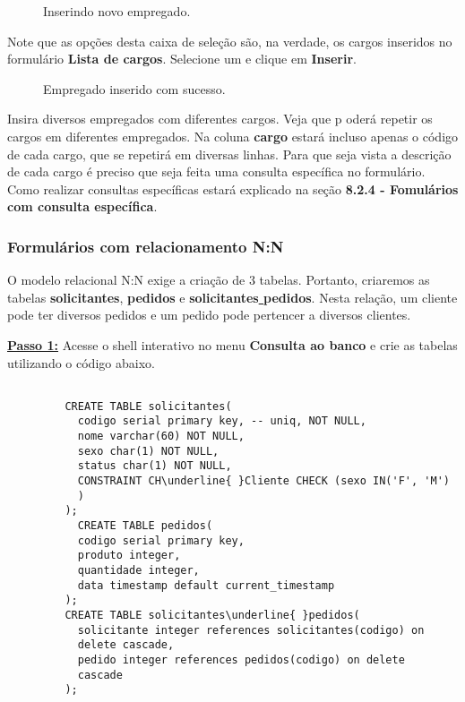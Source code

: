 \documentclass[9pt]{report}
\begin{document}
{       \begin{figure}[H]
        \caption{Inserindo novo empregado.}
        \label{fig:novoempregado}
       \end{figure}

       Note que as opções desta caixa de seleção são, na verdade, os
       cargos inseridos no formulário \textbf{Lista de cargos}.
       Selecione um e clique em \textbf{Inserir}.

       \begin{figure}[H]
        \caption{Empregado inserido com sucesso.}
        \label{fig:empregadoinserido}
       \end{figure}

       Insira diversos empregados com diferentes cargos. Veja que p
       oderá repetir os cargos em diferentes empregados. Na coluna
       \textbf{cargo} estará incluso apenas o código de cada cargo,
       que se repetirá em diversas linhas. Para que seja vista a
       descrição de cada cargo é preciso que seja feita uma consulta
       específica no formulário. Como realizar consultas específicas
       estará explicado na seção
       \textbf{8.2.4 - Fomulários com consulta específica}.

       \subsubsection{Formulários com relacionamento N:N}


       O modelo relacional N:N exige a criação de 3 tabelas.
       Portanto, criaremos as tabelas \textbf{solicitantes},
       \textbf{pedidos} e \textbf{solicitantes\underline{ }pedidos}.
       Nesta relação, um cliente pode ter diversos pedidos e um
      pedido pode pertencer a diversos clientes. 

       \underline{\textbf{Passo 1:}} Acesse o shell interativo no
       menu \textbf{Consulta ao banco} e crie as tabelas utilizando
       o código abaixo.
       
       \begin{lstlisting}

         CREATE TABLE solicitantes(
           codigo serial primary key, -- uniq, NOT NULL,
           nome varchar(60) NOT NULL,
           sexo char(1) NOT NULL,
           status char(1) NOT NULL,  
           CONSTRAINT CH\underline{ }Cliente CHECK (sexo IN('F', 'M')
           )
         );
           CREATE TABLE pedidos(
           codigo serial primary key,
           produto integer,
           quantidade integer,
           data timestamp default current_timestamp
         );
         CREATE TABLE solicitantes\underline{ }pedidos(
           solicitante integer references solicitantes(codigo) on
           delete cascade,
           pedido integer references pedidos(codigo) on delete
           cascade
         );
       \end{lstlisting}
        
}
\end{document}
